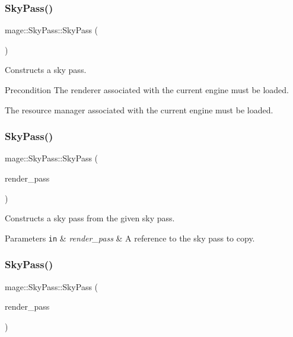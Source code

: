 \subsubsection{\texorpdfstring{Sky\+Pass()}{SkyPass()}\hspace{0.1cm}{\footnotesize\ttfamily [1/3]}}
{\footnotesize\ttfamily mage\+::\+Sky\+Pass\+::\+Sky\+Pass (\begin{DoxyParamCaption}{ }\end{DoxyParamCaption})}

Constructs a sky pass.

\begin{DoxyPrecond}{Precondition}
The renderer associated with the current engine must be loaded. 

The resource manager associated with the current engine must be loaded. 
\end{DoxyPrecond}
\hypertarget{classmage_1_1_sky_pass_a78be688fecb0a4f55df78d4af01c4590}{}\label{classmage_1_1_sky_pass_a78be688fecb0a4f55df78d4af01c4590} 
\subsubsection{\texorpdfstring{Sky\+Pass()}{SkyPass()}\hspace{0.1cm}{\footnotesize\ttfamily [2/3]}}
{\footnotesize\ttfamily mage\+::\+Sky\+Pass\+::\+Sky\+Pass (\begin{DoxyParamCaption}\item[{const \hyperlink{classmage_1_1_sky_pass}{Sky\+Pass} \&}]{render\+\_\+pass }\end{DoxyParamCaption})\hspace{0.3cm}{\ttfamily [delete]}}

Constructs a sky pass from the given sky pass.


\begin{DoxyParams}[1]{Parameters}
\mbox{\tt in}  & {\em render\+\_\+pass} & A reference to the sky pass to copy. \\
\hline
\end{DoxyParams}
\hypertarget{classmage_1_1_sky_pass_a6bd646c3f01beb171a19efe72b6cdbab}{}\label{classmage_1_1_sky_pass_a6bd646c3f01beb171a19efe72b6cdbab} 
\subsubsection{\texorpdfstring{Sky\+Pass()}{SkyPass()}\hspace{0.1cm}{\footnotesize\ttfamily [3/3]}}
{\footnotesize\ttfamily mage\+::\+Sky\+Pass\+::\+Sky\+Pass (\begin{DoxyParamCaption}\item[{\hyperlink{classmage_1_1_sky_pass}{Sky\+Pass} \&\&}]{render\+\_\+pass }\end{DoxyParamCaption})\hspace{0.3cm}{\ttfamily [default]}}

